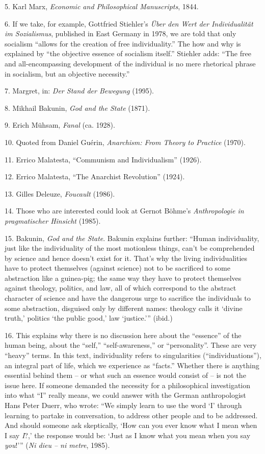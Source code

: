 {    5. Karl Marx, \textit{Economic and Philosophical Manuscripts}, 1844.

    6. If we take, for example, Gottfried Stiehler’s \textit{Über den Wert der
    Individualität im Sozialismus}, published in East Germany in 1978, we are
    told that only socialism “allows for the creation of free individuality.”
    The how and why is explained by “the objective essence of socialism itself.”
    Stiehler adds: “The free and all-encompassing development of the individual
    is no mere rhetorical phrase in socialism, but an objective necessity.”

    7. Margret, in: \textit{Der Stand der Bewegung} (1995).

    8. Mikhail Bakunin, \textit{God and the State} (1871).

    9. Erich Mühsam, \textit{Fanal} (ca. 1928).

    10. Quoted from Daniel Guérin, \textit{Anarchism: From Theory to Practice}
    (1970).

    11. Errico Malatesta, “Communism and Individualism” (1926).

    12. Errico Malatesta, “The Anarchist Revolution” (1924).

    13. Gilles Deleuze, \textit{Foucault} (1986).

    14. Those who are interested could look at Gernot Böhme’s
    \textit{Anthropologie in pragmatischer Hinsicht} (1985).

    15. Bakunin, \textit{God and the State}. Bakunin explains further: “Human
    individuality, just like the individuality of the most motionless things,
    can’t be comprehended by science and hence doesn’t exist for it. That’s why
    the living individualities have to protect themselves (against science) not
    to be sacrificed to some abstraction like a guinea-pig; the same way they
    have to protect themselves against theology, politics, and law, all of which
    correspond to the abstract character of science and have the dangerous urge
    to sacrifice the individuals to some abstraction, disguised only by
    different names: theology calls it ‘divine truth,’ politics ‘the public
    good,’ law ‘justice.’” (ibid.)

    16. This explains why there is no discussion here about the “essence” of the
    human being, about the “self,” “self-awareness,” or “personality”. These are
    very “heavy” terms. In this text, individuality refers to singularities
    (“individuations”), an integral part of life, which we experience as
    “facts.” Whether there is anything essential behind them – or what such an
    essence would consist of – is not the issue here. If someone demanded the
    necessity for a philosophical investigation into what “I” really means, we
    could answer with the German anthropologist Hans Peter Duerr, who wrote:
    “We simply learn to use the word ‘I’ through learning to partake in
    conversation, to address other people and to be addressed. And should
    someone ask skeptically, ‘How can you ever know what I mean when I say
    \textit{I}?,’ the response would be: ‘Just as I know what you mean when you
    say \textit{you}!’” (\textit{Ni dieu – ni metre}, 1985).

}
